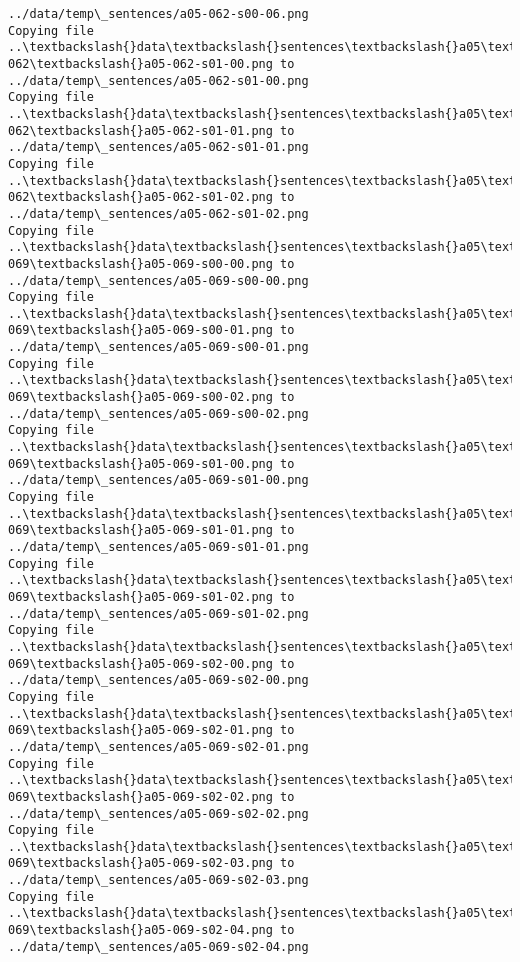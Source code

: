 \documentclass[11pt]{article}
\begin{document}
\begin{Verbatim}[commandchars=\\\{\}]
../data/temp\_sentences/a05-062-s00-06.png
Copying file ..\textbackslash{}data\textbackslash{}sentences\textbackslash{}a05\textbackslash{}a05-062\textbackslash{}a05-062-s01-00.png to
../data/temp\_sentences/a05-062-s01-00.png
Copying file ..\textbackslash{}data\textbackslash{}sentences\textbackslash{}a05\textbackslash{}a05-062\textbackslash{}a05-062-s01-01.png to
../data/temp\_sentences/a05-062-s01-01.png
Copying file ..\textbackslash{}data\textbackslash{}sentences\textbackslash{}a05\textbackslash{}a05-062\textbackslash{}a05-062-s01-02.png to
../data/temp\_sentences/a05-062-s01-02.png
Copying file ..\textbackslash{}data\textbackslash{}sentences\textbackslash{}a05\textbackslash{}a05-069\textbackslash{}a05-069-s00-00.png to
../data/temp\_sentences/a05-069-s00-00.png
Copying file ..\textbackslash{}data\textbackslash{}sentences\textbackslash{}a05\textbackslash{}a05-069\textbackslash{}a05-069-s00-01.png to
../data/temp\_sentences/a05-069-s00-01.png
Copying file ..\textbackslash{}data\textbackslash{}sentences\textbackslash{}a05\textbackslash{}a05-069\textbackslash{}a05-069-s00-02.png to
../data/temp\_sentences/a05-069-s00-02.png
Copying file ..\textbackslash{}data\textbackslash{}sentences\textbackslash{}a05\textbackslash{}a05-069\textbackslash{}a05-069-s01-00.png to
../data/temp\_sentences/a05-069-s01-00.png
Copying file ..\textbackslash{}data\textbackslash{}sentences\textbackslash{}a05\textbackslash{}a05-069\textbackslash{}a05-069-s01-01.png to
../data/temp\_sentences/a05-069-s01-01.png
Copying file ..\textbackslash{}data\textbackslash{}sentences\textbackslash{}a05\textbackslash{}a05-069\textbackslash{}a05-069-s01-02.png to
../data/temp\_sentences/a05-069-s01-02.png
Copying file ..\textbackslash{}data\textbackslash{}sentences\textbackslash{}a05\textbackslash{}a05-069\textbackslash{}a05-069-s02-00.png to
../data/temp\_sentences/a05-069-s02-00.png
Copying file ..\textbackslash{}data\textbackslash{}sentences\textbackslash{}a05\textbackslash{}a05-069\textbackslash{}a05-069-s02-01.png to
../data/temp\_sentences/a05-069-s02-01.png
Copying file ..\textbackslash{}data\textbackslash{}sentences\textbackslash{}a05\textbackslash{}a05-069\textbackslash{}a05-069-s02-02.png to
../data/temp\_sentences/a05-069-s02-02.png
Copying file ..\textbackslash{}data\textbackslash{}sentences\textbackslash{}a05\textbackslash{}a05-069\textbackslash{}a05-069-s02-03.png to
../data/temp\_sentences/a05-069-s02-03.png
Copying file ..\textbackslash{}data\textbackslash{}sentences\textbackslash{}a05\textbackslash{}a05-069\textbackslash{}a05-069-s02-04.png to
../data/temp\_sentences/a05-069-s02-04.png

\end{Verbatim}
\end{document}
